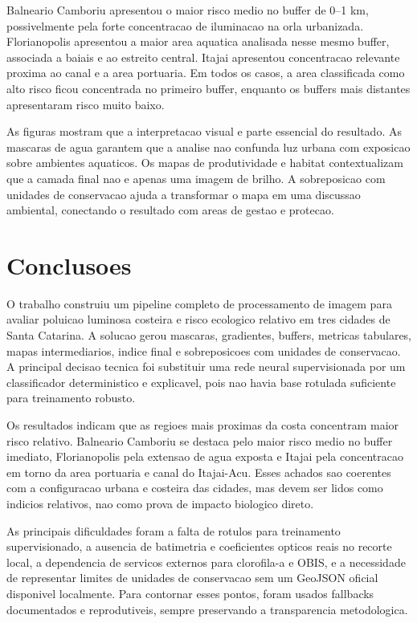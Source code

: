 \documentclass[12pt]{article}
\begin{document}
Balneario Camboriu apresentou o maior risco medio no buffer de 0--1 km, possivelmente pela forte concentracao de iluminacao na orla urbanizada. Florianopolis apresentou a maior area aquatica analisada nesse mesmo buffer, associada a baiais e ao estreito central. Itajai apresentou concentracao relevante proxima ao canal e a area portuaria. Em todos os casos, a area classificada como alto risco ficou concentrada no primeiro buffer, enquanto os buffers mais distantes apresentaram risco muito baixo.

As figuras mostram que a interpretacao visual e parte essencial do resultado. As mascaras de agua garantem que a analise nao confunda luz urbana com exposicao sobre ambientes aquaticos. Os mapas de produtividade e habitat contextualizam que a camada final nao e apenas uma imagem de brilho. A sobreposicao com unidades de conservacao ajuda a transformar o mapa em uma discussao ambiental, conectando o resultado com areas de gestao e protecao.

\section{Conclusoes}

O trabalho construiu um pipeline completo de processamento de imagem para avaliar poluicao luminosa costeira e risco ecologico relativo em tres cidades de Santa Catarina. A solucao gerou mascaras, gradientes, buffers, metricas tabulares, mapas intermediarios, indice final e sobreposicoes com unidades de conservacao. A principal decisao tecnica foi substituir uma rede neural supervisionada por um classificador deterministico e explicavel, pois nao havia base rotulada suficiente para treinamento robusto.

Os resultados indicam que as regioes mais proximas da costa concentram maior risco relativo. Balneario Camboriu se destaca pelo maior risco medio no buffer imediato, Florianopolis pela extensao de agua exposta e Itajai pela concentracao em torno da area portuaria e canal do Itajai-Acu. Esses achados sao coerentes com a configuracao urbana e costeira das cidades, mas devem ser lidos como indicios relativos, nao como prova de impacto biologico direto.

As principais dificuldades foram a falta de rotulos para treinamento supervisionado, a ausencia de batimetria e coeficientes opticos reais no recorte local, a dependencia de servicos externos para clorofila-a e OBIS, e a necessidade de representar limites de unidades de conservacao sem um GeoJSON oficial disponivel localmente. Para contornar esses pontos, foram usados fallbacks documentados e reprodutiveis, sempre preservando a transparencia metodologica.
\end{document}
